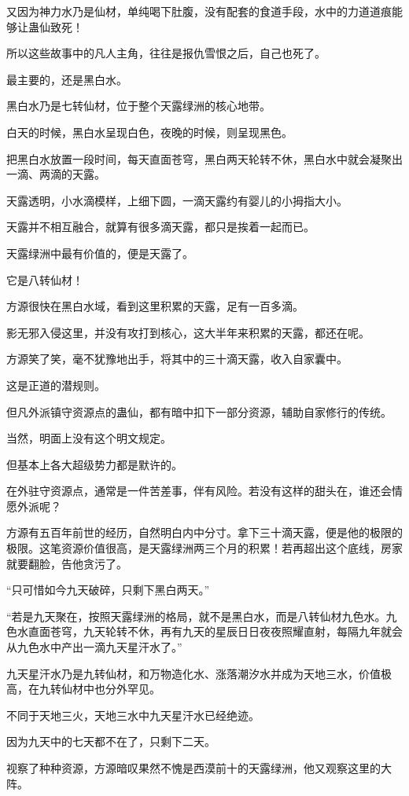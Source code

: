 \begin{this_body}
又因为神力水乃是仙材，单纯喝下肚腹，没有配套的食道手段，水中的力道道痕能够让蛊仙致死！

所以这些故事中的凡人主角，往往是报仇雪恨之后，自己也死了。

最主要的，还是黑白水。

黑白水乃是七转仙材，位于整个天露绿洲的核心地带。

白天的时候，黑白水呈现白色，夜晚的时候，则呈现黑色。

把黑白水放置一段时间，每天直面苍穹，黑白两天轮转不休，黑白水中就会凝聚出一滴、两滴的天露。

天露透明，小水滴模样，上细下圆，一滴天露约有婴儿的小拇指大小。

天露并不相互融合，就算有很多滴天露，都只是挨着一起而已。

天露绿洲中最有价值的，便是天露了。

它是八转仙材！

方源很快在黑白水域，看到这里积累的天露，足有一百多滴。

影无邪入侵这里，并没有攻打到核心，这大半年来积累的天露，都还在呢。

方源笑了笑，毫不犹豫地出手，将其中的三十滴天露，收入自家囊中。

这是正道的潜规则。

但凡外派镇守资源点的蛊仙，都有暗中扣下一部分资源，辅助自家修行的传统。

当然，明面上没有这个明文规定。

但基本上各大超级势力都是默许的。

在外驻守资源点，通常是一件苦差事，伴有风险。若没有这样的甜头在，谁还会情愿外派呢？

方源有五百年前世的经历，自然明白内中分寸。拿下三十滴天露，便是他的极限的极限。这笔资源价值很高，是天露绿洲两三个月的积累！若再超出这个底线，房家就要翻脸，告他贪污了。

“只可惜如今九天破碎，只剩下黑白两天。”

“若是九天聚在，按照天露绿洲的格局，就不是黑白水，而是八转仙材九色水。九色水直面苍穹，九天轮转不休，再有九天的星辰日日夜夜照耀直射，每隔九年就会从九色水中产出一滴九天星汗水了。”

九天星汗水乃是九转仙材，和万物造化水、涨落潮汐水并成为天地三水，价值极高，在九转仙材中也分外罕见。

不同于天地三火，天地三水中九天星汗水已经绝迹。

因为九天中的七天都不在了，只剩下二天。

视察了种种资源，方源暗叹果然不愧是西漠前十的天露绿洲，他又观察这里的大阵。


\end{this_body}
